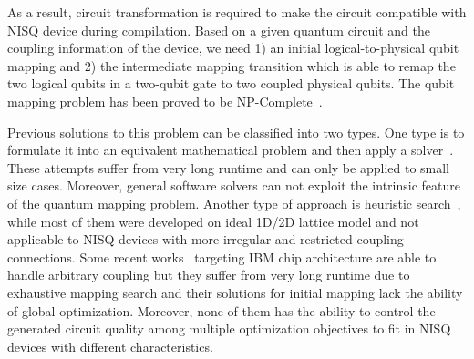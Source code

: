 \documentclass[journal,10pt,twocolumn]{IEEEtran}
\begin{document}
As a result, circuit transformation is required to make the circuit compatible with NISQ device during compilation. 
Based on a given quantum circuit and the coupling information of the device, we need 1) an initial logical-to-physical qubit mapping and 2) the intermediate mapping transition which is able to remap the two logical qubits in a two-qubit gate to two coupled physical qubits.
The qubit mapping problem has been proved to be NP-Complete~\cite{siraichi2018qubit}.


Previous solutions to this problem can be classified into two types. One type is to formulate it into an equivalent mathematical problem and then apply a solver~\cite{maslov2008quantum,chakrabarti2011linear,shafaei2013optimization,shafaei2014qubit,wille2014optimal,lye2015determining,venturelli2017temporal,venturelli2018compiling,booth2018comparing,oddi2018greedy,bhattacharjee2017depth}. 
These attempts suffer from very long runtime and can only be applied to small size cases. 
Moreover, general software solvers can not exploit the intrinsic feature of the quantum mapping problem.  
Another type of approach is heuristic search~\cite{alfailakawi2014lnn,saeedi2011synthesis,lin2015paqcs,wille2016look,shrivastwa2015fast,kole2016heuristic,kole2018new,bhattacharjee2018novel}, while most of them were developed on ideal 1D/2D lattice model and not applicable to NISQ devices with more irregular and restricted coupling connections. 
Some recent works~\cite{IBMqiskit,siraichi2018qubit,zulehner2018efficient} targeting IBM chip architecture are able to handle arbitrary coupling but they suffer from very long runtime due to exhaustive mapping search and their solutions for initial mapping lack the ability of global optimization. Moreover, none of them has the ability to control the generated circuit quality among multiple optimization objectives to fit in NISQ devices with different characteristics.



\end{document}
